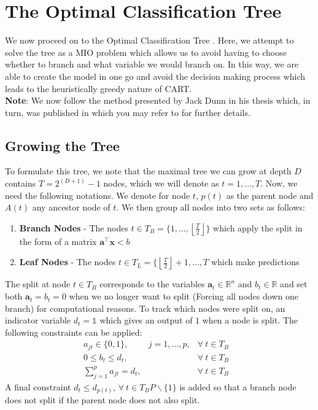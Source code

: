 \documentclass[11pt,a4paper]{report}
\begin{document}
\section{The Optimal Classification Tree}
We now proceed on to the Optimal Classification Tree \cite{oct}.
Here, we attempt to solve the tree as a MIO problem which allows us to avoid having to choose whether to branch and what variable we would branch on.
In this way, we are able to create the model in one go and avoid the decision making process which leads to the heuristically greedy nature of CART.\\
\textbf{Note}: We now follow the method presented by Jack Dunn in his thesis which, in turn, was published in \cite{oct} which you may refer to for further details.

\subsection{Growing the Tree}
To formulate this tree, we note that the maximal tree we can grow at depth $D$ contains $T = 2^{(D + 1)} - 1$ nodes, which we will denote as $t = 1,\dots,T$. Now, we need the following notations.
We denote for node $t$, $p(t)$ as the parent node and $A(t)$ any ancestor node of $t$. We then group all nodes into two sets as follows:
\begin{enumerate}
    \item \textbf{Branch Nodes} - The nodes $t \in T_B = \{1,\dots,\left \lfloor{\frac{T}{2}} \right \rfloor \}$ which apply the split in the form of a matrix $\mathbf{a}^\intercal \mathbf{x} < b$
    
    \item \textbf{Leaf Nodes} - The nodes $t \in T_L = \{\left \lfloor{\frac{T}{2}} \right \rfloor + 1, \dots, T$ which make predictions
\end{enumerate}
The split at node $t \in T_B$ corresponds to the variables $\mathbf{a}_t \in \mathbb{R}^n$ and $b_t \in \mathbb{R}$ and set both $\textbf{a}_t = b_t = 0$ when we no longer want to split (Forcing all nodes down one branch) for computational reasons.
To track which nodes were split on, an indicator variable $d_t = \mathds{1}$ which gives an output of $1$ when a node is split.
The following constraints can be applied:
\begin{align}
     a_{jt} \in \{0,1\}, & j=1,\dots,p, & \forall \ t \in T_B \label{eq:octconditions1}\\
    0 \leq b_t \leq d_t, & & \forall \ t \in T_B & \label{eq:octconditions2}\\
    \sum_{j=1}^{p} a_{jt} = d_t, & & \forall \ t \in T_B & \label{eq:octconditions3} 
\end{align}
A final constraint $d_t \leq d_{p(t)}$, $\forall \ t \in T_B P \backslash \{1\}$ is added so that a branch node does not split if the parent node does not also split.
\end{document}
